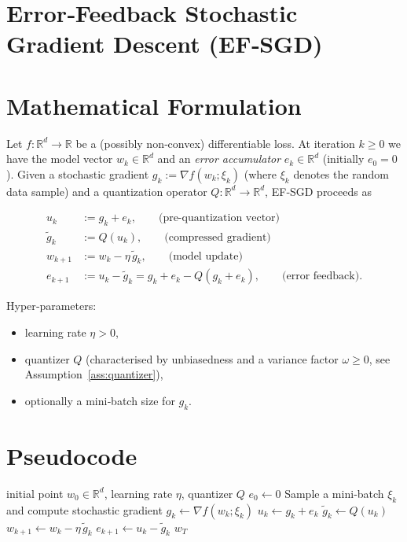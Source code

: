 \documentclass{article}
\begin{document}
\section*{Error‑Feedback Stochastic Gradient Descent (EF‑SGD)}

\section*{Mathematical Formulation}
Let $f:\mathbb{R}^d\rightarrow\mathbb{R}$ be a (possibly non‑convex) differentiable loss.  
At iteration $k\ge 0$ we have the model vector $w_k\in\mathbb{R}^d$ and an \emph{error accumulator}
$e_k\in\mathbb{R}^d$ (initially $e_0=0$).  
Given a stochastic gradient $g_k:=\nabla f(w_k;\xi_k)$ (where $\xi_k$ denotes the random data sample) and a
quantization operator $Q:\mathbb{R}^d\rightarrow\mathbb{R}^d$, EF‑SGD proceeds as

\[
\begin{aligned}
u_k &:= g_k + e_k, \qquad\text{(pre‑quantization vector)}\\[4pt]
\tilde g_k &:= Q(u_k), \qquad\text{(compressed gradient)}\\[4pt]
w_{k+1} &:= w_k - \eta\,\tilde g_k, \qquad\text{(model update)}\\[4pt]
e_{k+1} &:= u_k-\tilde g_k = g_k+e_k-Q(g_k+e_k), \qquad\text{(error feedback)} .
\end{aligned}
\tag{EF‑SGD}
\]

\noindent Hyper‑parameters:
\begin{itemize}
\item learning rate $\eta>0$,
\item quantizer $Q$ (characterised by unbiasedness and a variance factor $\omega\ge0$,
see Assumption~\ref{ass:quantizer}),
\item optionally a mini‑batch size for $g_k$.
\end{itemize}

\section*{Pseudocode}
\begin{algorithm}[H]
\caption{EF‑SGD}
\begin{algorithmic}[1]
\REQUIRE initial point $w_0\in\mathbb{R}^d$, learning rate $\eta$, quantizer $Q$
\STATE $e_0\leftarrow 0$
    \STATE Sample a mini‑batch $\xi_k$ and compute stochastic gradient $g_k\gets \nabla f(w_k;\xi_k)$
    \STATE $u_k \leftarrow g_k+e_k$                     
    \STATE $\tilde g_k \leftarrow Q(u_k)$               
    \STATE $w_{k+1} \leftarrow w_k - \eta\,\tilde g_k$  
    \STATE $e_{k+1} \leftarrow u_k-\tilde g_k$          
\ENDFOR
\RETURN $w_T$
\end{algorithmic}
\end{algorithm}
\end{document}
